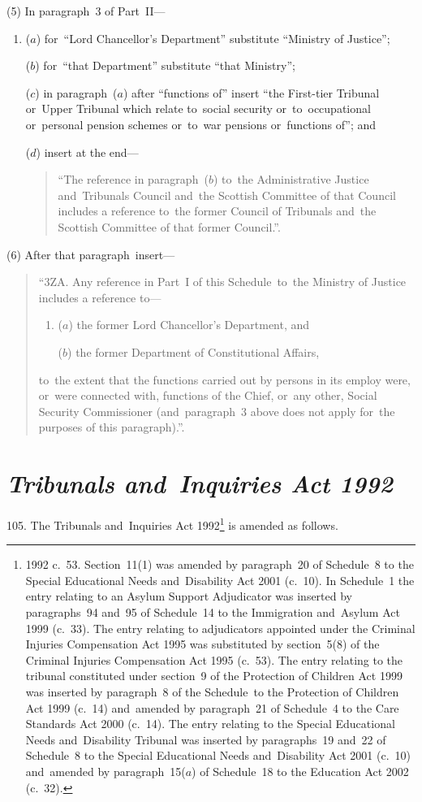 \documentclass[12pt,a4paper]{article}
\begin{document}
(5) In paragraph~3 of Part~II—
\begin{enumerate}\item[]
($a$) for~“Lord Chancellor’s Department” substitute “Ministry of Justice”;

($b$) for~“that Department” substitute “that Ministry”;

($c$) in paragraph~($a$)  after “functions of” insert “the First-tier Tribunal or~Upper Tribunal which relate to~social security or~to~occupational or~personal pension schemes or~to~war pensions or~functions of”; and

($d$) insert at the end—
\begin{quotation}
“The reference in paragraph~($b$)  to~the Administrative Justice and~Tribunals Council and~the Scottish Committee of that Council includes a reference to~the former Council of Tribunals and~the Scottish Committee of that former Council.”.
\end{quotation}
\end{enumerate}

(6) After that paragraph~insert—
\begin{quotation}
“3ZA.  Any reference in Part~I of this Schedule~to~the Ministry of Justice includes a reference to—
\begin{enumerate}\item[]
($a$) the former Lord Chancellor’s Department, and

($b$) the former Department of Constitutional Affairs,
\end{enumerate}
to~the extent that the functions carried out by persons in its employ were, or~were connected with, functions of the Chief, or~any other, Social Security Commissioner (and~paragraph~3 above does not apply for~the purposes of this paragraph).”.
\end{quotation}

\section*{\itshape Tribunals and~Inquiries Act 1992}

105.  The Tribunals and~Inquiries Act 1992\footnote{1992 c.~53. Section~11(1) was amended by paragraph~20 of Schedule~8 to the Special Educational Needs and~Disability Act 2001 (c.~10). In Schedule~1 the entry relating to an Asylum Support Adjudicator was inserted by paragraphs~94 and~95 of Schedule~14 to the Immigration and~Asylum Act 1999 (c.~33). The entry relating to adjudicators appointed under the Criminal Injuries Compensation Act 1995 was substituted by section~5(8) of the Criminal Injuries Compensation Act 1995 (c.~53). The entry relating to the tribunal constituted under section~9 of the Protection of Children Act 1999 was inserted by paragraph~8 of the Schedule~to the Protection of Children Act 1999 (c.~14) and~amended by paragraph~21 of Schedule~4 to the Care Standards Act 2000 (c.~14). The entry relating to the Special Educational Needs and~Disability Tribunal was inserted by paragraphs~19 and~22 of Schedule~8 to the Special Educational Needs and~Disability Act 2001 (c.~10) and~amended by paragraph~15($a$) of Schedule~18 to the Education Act 2002 (c.~32).} is amended as follows.
\end{document}
